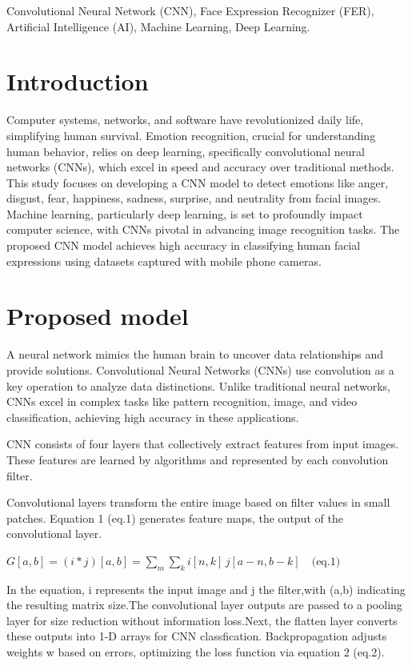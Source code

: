 \documentclass[conference]{IEEEtran}
\begin{document}
\begin{IEEEkeywords}
Convolutional Neural Network (CNN), Face Expression Recognizer (FER), Artificial Intelligence (AI), Machine Learning, Deep Learning.
\end{IEEEkeywords}

\section{Introduction}
Computer systems, networks, and software have revolutionized daily life, simplifying human survival. Emotion recognition, crucial for understanding human behavior, relies on deep learning, specifically convolutional neural networks (CNNs), which excel in speed and accuracy over traditional methods. This study focuses on developing a CNN model to detect emotions like anger, disgust, fear, happiness, sadness, surprise, and neutrality from facial images. Machine learning, particularly deep learning, is set to profoundly impact computer science, with CNNs pivotal in advancing image recognition tasks. The proposed CNN model achieves high accuracy in classifying human facial expressions using datasets captured with mobile phone cameras. 

\section{Proposed model}
A neural network mimics the human brain to uncover data relationships and provide solutions. Convolutional Neural Networks (CNNs) use convolution as a key operation to analyze data distinctions. Unlike traditional neural networks, CNNs excel in complex tasks like pattern recognition, image, and video classification, achieving high accuracy in these applications.

CNN consists of four layers that collectively extract features from input images. These features are learned by algorithms and represented by each convolution filter.

Convolutional layers transform the entire image based on filter values in small patches. Equation 1 (eq.1) generates feature maps, the output of the convolutional layer.

$G[a,b] = (i * j)[a,b] = \sum_{m} \sum_{k} i[n,k] \, j[a - n, b - k] \quad \text{(eq.1)}$


In the equation, i represents the input image and j the filter,with (a,b) indicating the resulting matrix size.The convolutional layer outputs are passed to a pooling layer for size reduction without information loss.Next, the flatten layer converts these outputs into 1-D arrays for CNN classfication. Backpropagation adjusts weights w based on errors, optimizing the loss function via equation 2 (eq.2).
\end{document}
